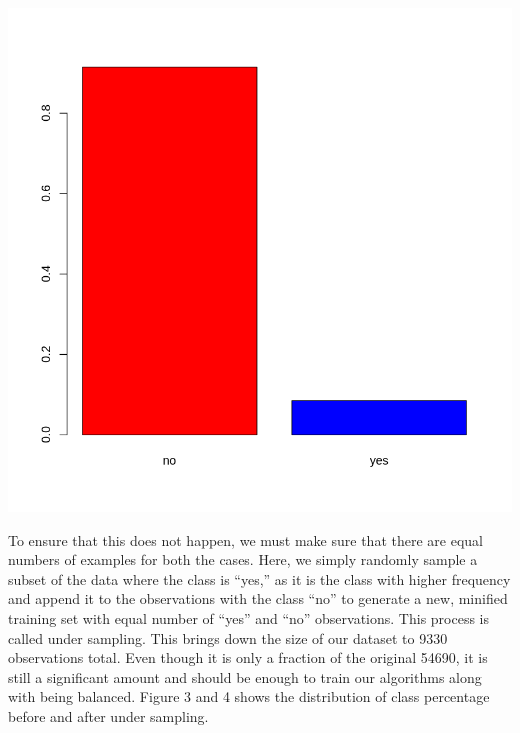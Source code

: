 \documentclass[
]{article}
\let\origfigure\figure
\let\endorigfigure\endfigure
\renewenvironment{figure}[1][2] {
    \expandafter\origfigure\expandafter[H]
} {
    \endorigfigure
}
\begin{document}
\begin{figure}
\centering
\includegraphics{./imgs/class_imbalance.png}
\caption{Distribution of class percentage before under-sampling}
\end{figure}

To ensure that this does not happen, we must make sure that there are
equal numbers of examples for both the cases. Here, we simply randomly
sample a subset of the data where the class is ``yes,'' as it is the
class with higher frequency and append it to the observations with the
class ``no'' to generate a new, minified training set with equal number
of ``yes'' and ``no'' observations. This process is called under
sampling. This brings down the size of our dataset to 9330 observations
total. Even though it is only a fraction of the original 54690, it is
still a significant amount and should be enough to train our algorithms
along with being balanced. Figure 3 and 4 shows the distribution of
class percentage before and after under sampling.
\end{document}
